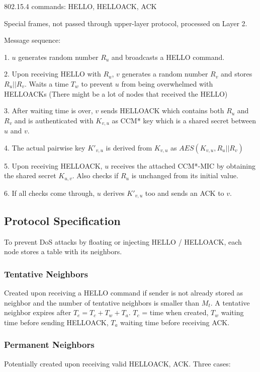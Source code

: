 \documentclass[10pt]{article}
\begin{document}
802.15.4 commands: HELLO, HELLOACK, ACK

Special frames, not passed through upper-layer protocol, processed on Layer 2.

Message sequence:

1. $u$ generates random number $R_u$ and broadcasts a HELLO command.

2. Upon receiving HELLO with $R_u$, $v$ generates a random number $R_v$ and stores $R_u || R_v$. Waits a time $T_w$ to prevent $u$ from being overwhelmed with HELLOACKs (There might be a lot of nodes that received the HELLO)

3. After waiting time is over, $v$ sends HELLOACK which contains both $R_u$ and $R_v$ and is authenticated with $K_{v,u}$ as CCM* key which is a shared secret between $u$ and $v$.

4. The actual pairwise key $K'_{v,u}$ is derived from $K_{v,u}$ as $AES(K_{v,u}, R_u||R_v)$

5. Upon receiving HELLOACK, $u$ receives the attached CCM*-MIC by obtaining the shared secret $K_{u,v}$. Also checks if $R_u$ is unchanged from its initial value.

6. If all checks come through, $u$ derives $K'_{v,u}$ too and sends an ACK to $v$.



\subsection{Protocol Specification}

To prevent DoS attacks by floating or injecting HELLO / HELLOACK, each node stores a table with its neighbors. 

\subsubsection{Tentative Neighbors}

Created upon receiving a HELLO command if sender is not already stored as neighbor and the number of tentative neighbors is smaller than $M_t$. A tentative neighbor expires after $T_e = T_c + T_w + T_a$. $T_c$ = time when created, $T_w$ waiting time before sending HELLOACK, $T_a$ waiting time before receiving ACK.

\subsubsection{Permanent Neighbors}

Potentially created upon receiving valid HELLOACK, ACK. Three cases:
\end{document}
